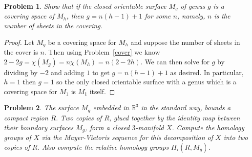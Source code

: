 \documentclass{article}
\newtheorem{problem}{Problem}
\begin{document}
\begin{problem}
Show that if the closed orientable surface $M_g$ of genus $g$ is a covering space of $M_h$, then $g = n(h-1) + 1$ for some $n$, namely, $n$ is the number of sheets in the covering.
\end{problem}
\begin{proof}
Let $M_g$ be a covering space for $M_h$ and suppose the number of sheets in the cover is $n$. Then using Problem~\ref{cover} we know $2-2g = \chi(M_g) = n \chi(M_h) = n(2-2h)$. We can then solve for $g$ by dividing by $-2$ and adding $1$ to get $g = n(h-1) + 1$ as desired. In particular, $h = 1$ then $g = 1$ so the only closed orientable surface with a genus which is a covering space for $M_1$ is $M_1$ itself.
\end{proof}

\begin{problem}
The surface $M_g$ embedded in $\mathbb{R}^3$ in the standard way, bounds a compact region $R$. Two copies of $R$, glued together by the identity map between their boundary surfaces $M_g$, form a closed $3$-manifold $X$. Compute the homology groups of $X$ via the Mayer-Vietoris sequence for this decomposition of $X$ into two copies of $R$. Also compute the relative homology groups $H_i(R, M_g)$.
\end{problem}
\end{document}
